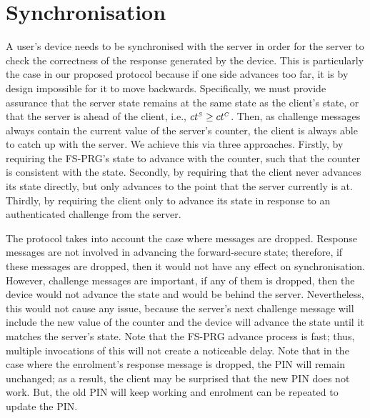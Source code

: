 


\section{Synchronisation}
\label{app:synchronisation}

A user's device needs to be synchronised with the server
in order for the server to check the correctness of the response generated by the device.
This is particularly the case in our proposed protocol because
if one side advances too far, it is by design impossible for it to
move backwards. Specifically, we must provide assurance that the server state remains at the same state as the client's state, or that the server is ahead of the client, i.e., ${ct}^{\scriptscriptstyle S} \geq {ct}^{\scriptscriptstyle C}$. Then, as challenge messages always contain the current value of the server's counter, the client is always able to catch up with the server. We achieve this via three approaches.  Firstly, by requiring the FS-PRG's state to advance with the counter, such that the counter is consistent with the state. Secondly, by requiring that the client never advances its state directly, but only advances to the point that the server currently is at. Thirdly, by requiring the client only to advance its state in response to an authenticated challenge from the server.%


The protocol takes into account the case where messages are dropped.
Response messages are not involved in advancing the forward-secure state; therefore, if these messages are dropped, then it would not have any effect on synchronisation. However, challenge messages are important, if any of them is dropped, then the device would not advance the state and would be behind the server. Nevertheless, this would not cause any issue, because the server's next challenge message will include the new value of the counter and the device will advance the state until it matches the server's state. Note that 
the FS-PRG advance process is fast; thus,  multiple invocations of this will not create a noticeable delay.
%
 Note that in the case where the enrolment's response message is dropped, the PIN will remain unchanged; as a result,  the client may be surprised that the new PIN does not work. But, the old PIN will keep working and enrolment can be repeated to update the PIN.
